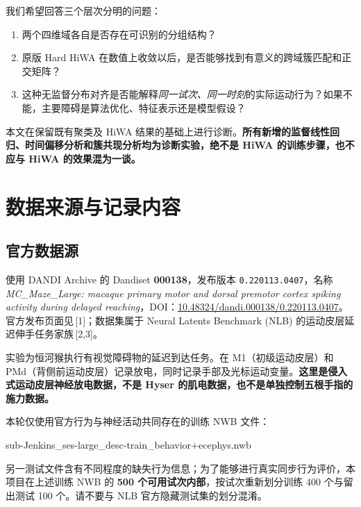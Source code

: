 \documentclass[UTF8,zihao=-4,a4paper]{ctexart}
\begin{document}
我们希望回答三个层次分明的问题：
\begin{enumerate}[leftmargin=2.5em,itemsep=4pt]
\item 两个四维域各自是否存在可识别的分组结构？
\item 原版 Hard HiWA 在数值上收敛以后，是否能够找到有意义的跨域簇匹配和正交矩阵？
\item 这种无监督分布对齐是否能解释\emph{同一试次、同一时刻}的实际运动行为？如果不能，主要障碍是算法优化、特征表示还是模型假设？
\end{enumerate}
本文在保留既有聚类及 HiWA 结果的基础上进行诊断。\textbf{所有新增的监督线性回归、时间偏移分析和簇共现分析均为诊断实验，绝不是 HiWA 的训练步骤，也不应与 HiWA 的效果混为一谈。}

\section{数据来源与记录内容}
\subsection{官方数据源}
使用 DANDI Archive 的 Dandiset \textbf{000138}，发布版本 \texttt{0.220113.0407}，名称 \emph{MC\_Maze\_Large: macaque primary motor and dorsal premotor cortex spiking activity during delayed reaching}，DOI：\href{https://doi.org/10.48324/dandi.000138/0.220113.0407}{10.48324/dandi.000138/0.220113.0407}。官方发布页面见\,[1]；数据集属于 Neural Latents Benchmark (NLB) 的运动皮层延迟伸手任务家族\,[2,3]。

实验为恒河猴执行有视觉障碍物的延迟到达任务。在 M1（初级运动皮层）和 PMd（背侧前运动皮层）记录放电，同时记录手部及光标运动变量。\textbf{这里是侵入式运动皮层神经放电数据，不是 Hyser 的肌电数据，也不是单独控制五根手指的施力数据。}

本轮仅使用官方行为与神经活动共同存在的训练 NWB 文件：
\begin{center}
\ttfamily\small sub-Jenkins\_ses-large\_desc-train\_behavior+ecephys.nwb
\end{center}
另一测试文件含有不同程度的缺失行为信息；为了能够进行真实同步行为评价，本项目在上述训练 NWB 的 \textbf{500 个可用试次内部}，按试次重新划分训练 400 个与留出测试 100 个。请不要与 NLB 官方隐藏测试集的划分混淆。
\end{document}
